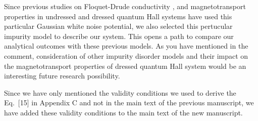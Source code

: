 \documentclass{article}
\begin{document}
Since previous studies on Floquet-Drude conductivity \cite{wackerl20}, and magnetotransport properties in undressed \cite{endo09} and dressed \cite{dini16} quantum Hall systems have used this particular Gaussian white noise potential, we also selected this pertucular impurity model to describe our system. This opens a path to compare our analytical outcomes with these previous models. As you have mentioned in the comment, consideration of other impurity disorder models and their impact on the magnetotransport properties of dressed quantum Hall system would be an interesting future research possibility.

Since we have only mentioned the validity conditions we used to derive the Eq.~[15] in Appendix C and not in the main text of the previous manuscript, we have added these validity conditions to the main text of the new manuscript.
\end{document}
